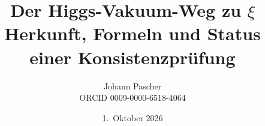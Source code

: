 \documentclass[11pt,a4paper]{report}
\title{Der Higgs-Vakuum-Weg zu $\xi$\\[0.5em]
  \large Herkunft, Formeln und Status einer Konsistenzprüfung}
\date{1.~Oktober 2026}
\author{Johann Pascher\\\small ORCID 0009-0000-6518-4064}
\begin{document}
\renewcommand{\thechapter}{}
\renewcommand{\thesection}{\arabic{section}}
\maketitle
\tableofcontents

\end{document}

